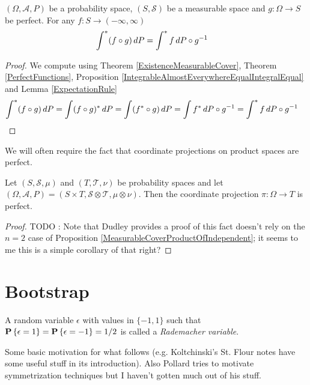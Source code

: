 \begin{cor}\label{cor:OuterExpectationRule}$(\Omega, \mathcal{A}, P)$ be a probability space, $(S, \mathcal{S})$ be a measurable space and $g : \Omega \to S$ be perfect.  For any $f : S \to (-\infty, \infty)$
\begin{align*}
\int^* (f \circ g) \, dP &= \int^* f \, d\pushforward{g}{P}
\end{align*}
\end{cor}
\begin{proof}
We compute using Theorem \ref{ExistenceMeasurableCover}, Theorem \ref{PerfectFunctions}, Proposition \ref{IntegrableAlmostEverywhereEqualIntegralEqual} and Lemma \ref{ExpectationRule}
\begin{align*}
\int^* (f \circ g) \, dP &= \int (f \circ g)^* \, dP = \int (f^* \circ g) \, dP = \int f^* \, d\pushforward{g}{P} = \int^* f  \, d\pushforward{g}{P}
\end{align*}
\end{proof}

We will often require the fact that coordinate projections on product spaces are perfect.
\begin{prop}\label{prop:CoordinateProjectionsArePerfect}Let $(S, \mathcal{S}, \mu)$ and $(T, \mathcal{T}, \nu)$ be probability spaces and let $(\Omega, \mathcal{A}, P) = (S\times T, \mathcal{S}\otimes \mathcal{T}, \mu \otimes \nu)$.  Then the coordinate projection $\pi : \Omega \to T$ is perfect.
\end{prop}
\begin{proof}
TODO : Note that Dudley provides a proof of this fact doesn't rely on the $n=2$ case of Proposition \ref{MeasurableCoverProductOfIndependent}; it seems to me this is a simple corollary of that right?
\end{proof}

\section{Bootstrap}

\begin{defn}A random variable $\epsilon$ with values in $\lbrace -1, 1 \rbrace$ such that $\probability{\epsilon = 1} = \probability{\epsilon = -1} = 1/2$ is called a \emph{Rademacher variable}.
\end{defn}

Some basic motivation for what follows (e.g. Koltchinski's St. Flour notes have some useful stuff in its introduction).   Also Pollard tries to motivate symmetrization techniques but I haven't gotten much out of his stuff.


